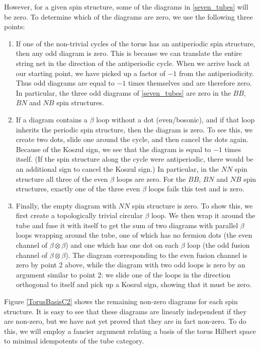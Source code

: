 \documentclass[12pt,a4paper]{article}
\newcommand{\tp}{\otimes}
\begin{document}
However, for a given spin structure, some of the diagrams in \eqref{seven_tubes} will be zero.
To determine which of the diagrams are zero, we use the following three points:
\begin{enumerate}
	\item If one of the non-trivial cycles of the torus has an antiperiodic spin structure, then any odd diagram is zero.
	This is because we can translate the entire string net in the direction of the antiperiodic cycle.
	When we arrive back at our starting point, we have picked up a factor of $-1$ from the antiperiodicity.
	Thus odd diagrams are equal to $-1$ times themselves and are therefore zero.
	In particular, the three odd diagrams of \eqref{seven_tubes} are zero in the $BB$, $BN$ and $NB$ spin structures.
	\item If a diagram contains a $\beta$ loop without a dot (even/bosonic), and if that loop inherits the periodic spin structure,
	then the diagram is zero.
	To see this, we create two dots, slide one around the cycle, and then cancel the dots again.
	Because of the Koszul sign, we see that the diagram is equal to $-1$ times itself.
	(If the spin structure along the cycle were antiperiodic, there would be an additional sign to cancel the Koszul sign.)
	In particular, in the $NN$ spin structure all three of the even $\beta$ loops are zero.
	For the $BB$, $BN$ and $NB$ spin structures, exactly one of the three even $\beta$ loops fails this test and is zero.
	\item Finally, the empty diagram with $NN$ spin structure is zero. To show this, 
	we first create a topologically trivial circular $\beta$ loop. We then wrap it around the tube and fuse it 
	with itself to get the sum of two diagrams with parallel $\beta$ loops wrapping around the tube, one of 
	which has no fermion dots (the even channel of $\beta\tp \beta$) and one which has one dot on each $
	\beta$ loop (the odd fusion channel of $\beta\tp\beta$). 
	The diagram corresponding to the even fusion channel 
	is zero by point 2 above, while the diagram with two odd loops is zero by an argument similar to point 2: we slide one of the loops in the direction
	orthogonal to itself and pick up a Koszul sign, showing that it must be zero.
\end{enumerate}

Figure \ref{TorusBasisC2} shows the remaining non-zero diagrams for each spin structure.
It is easy to see that these diagrams are linearly independent if they are non-zero, but we have not yet proved that they are in fact non-zero.
To do this, we will employ a fancier argument relating a basis of the torus Hilbert space to minimal idempotents of the tube category.
\end{document}
